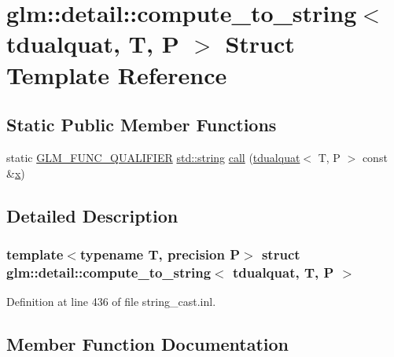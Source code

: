 \hypertarget{structglm_1_1detail_1_1compute__to__string_3_01tdualquat_00_01_t_00_01_p_01_4}{}\section{glm\+::detail\+::compute\+\_\+to\+\_\+string$<$ tdualquat, T, P $>$ Struct Template Reference}
\label{structglm_1_1detail_1_1compute__to__string_3_01tdualquat_00_01_t_00_01_p_01_4}
\subsection*{Static Public Member Functions}
\begin{DoxyCompactItemize}
\item 
static \mbox{\hyperlink{setup_8hpp_a33fdea6f91c5f834105f7415e2a64407}{G\+L\+M\+\_\+\+F\+U\+N\+C\+\_\+\+Q\+U\+A\+L\+I\+F\+I\+ER}} \mbox{\hyperlink{glad_8h_ac83513893df92266f79a515488701770}{std\+::string}} \mbox{\hyperlink{structglm_1_1detail_1_1compute__to__string_3_01tdualquat_00_01_t_00_01_p_01_4_a1768ea4c6a68bcecf9571363b69c1497}{call}} (\mbox{\hyperlink{structglm_1_1tdualquat}{tdualquat}}$<$ T, P $>$ const \&\mbox{\hyperlink{glad_8h_a92d0386e5c19fb81ea88c9f99644ab1d}{x}})
\end{DoxyCompactItemize}


\subsection{Detailed Description}
\subsubsection*{template$<$typename T, precision P$>$\newline
struct glm\+::detail\+::compute\+\_\+to\+\_\+string$<$ tdualquat, T, P $>$}



Definition at line 436 of file string\+\_\+cast.\+inl.



\subsection{Member Function Documentation}
\mbox{\label{structglm_1_1detail_1_1compute__to__string_3_01tdualquat_00_01_t_00_01_p_01_4_a1768ea4c6a68bcecf9571363b69c1497}} 
